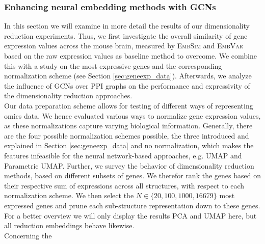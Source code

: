 \documentclass[]{article}
\begin{document}
\subsubsection{Enhancing neural embedding methods with GCNs}
\label{sec:results_dim_GCN}
In this section we will examine in more detail the results of our dimensionality reduction experiments. 
Thus, we first investigate the overall similarity of gene expression values across the mouse brain, measured by \textsc{EmbSim} and \textsc{EmbVar} based on the raw expression values as baseline method to overcome. We combine this with a study on the most expressive genes and the corresponding normalization scheme (see Section \ref{sec:geneexp_data}). Afterwards, we  analyze the influence of GCNs over PPI graphs on the performance and expressivity of the dimensionality reduction approaches.\\

Our data preparation scheme allows for testing of different ways of representing omics data. We hence evaluated various ways to normalize gene expression values, as these normalizations capture varying biological information. Generally, there are the four possible normalization schemes possible, the three introduced and explained in Section \ref{sec:geneexp_data} and no normalization, which makes the features infeasible for the neural network-based approaches, e.g. UMAP and Parametric UMAP.
Further, we survey the behavior of dimensionality reduction methods, based on different subsets of genes. We therefor rank the genes based on their respective sum of expressions across all structures, with respect to each normalization scheme. We then select the $N\in \{20, 100, 1000, 16679\}$ most expressed genes and prune each sub-structure representation down to these genes. For a better overview we will only display the results PCA and UMAP here, but all reduction embeddings behave likewise.\\

Concerning the 
\end{document}
